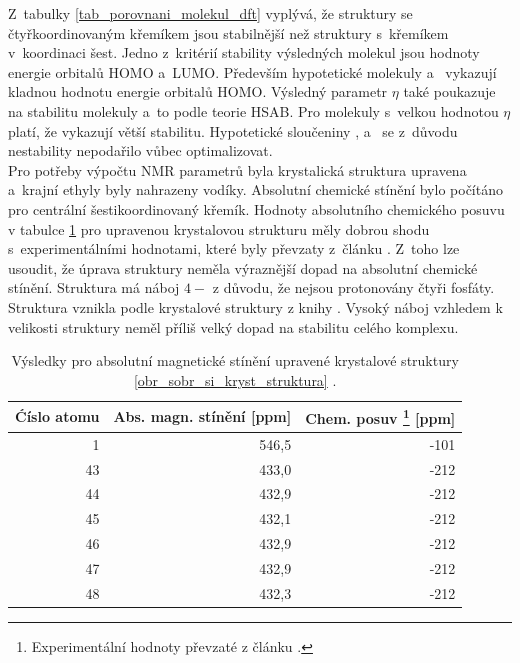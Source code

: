 \documentclass[
  printed, %
  table,   %
  lof,     %
  lot,     %
  oneside,
]{fithesis3}
\begin{document}
Z~tabulky \ref{tab_porovnani_molekul_dft} vyplývá, že struktury se čtyřkoordinovaným křemíkem jsou stabilnější než struktury s~křemíkem v~koordinaci šest. Jedno z~kritérií stability výsledných molekul jsou hodnoty energie orbitalů HOMO a~LUMO. Především hypotetické molekuly  a~ vykazují kladnou hodnotu energie orbitalů HOMO. Výsledný parametr $\eta$ také poukazuje na stabilitu molekuly a~to podle teorie HSAB. Pro molekuly s~velkou hodnotou $\eta$ platí, že vykazují větší stabilitu. Hypotetické sloučeniny  ,  a~ se z~důvodu nestability nepodařilo vůbec optimalizovat. \\
Pro potřeby výpočtu NMR parametrů byla krystalická struktura upravena a~krajní ethyly byly nahrazeny vodíky. Absolutní chemické stínění bylo počítáno pro centrální šestikoordinovaný křemík. Hodnoty absolutního chemického posuvu v tabulce \ref{vysledky_abs_magn_stineni} pro upravenou krystalovou strukturu měly dobrou shodu s~experimentálními hodnotami, které byly převzaty z~článku \cite{C3NJ00721A}. Z~toho lze usoudit, že úprava struktury neměla výraznější dopad na absolutní chemické stínění. Struktura  má náboj $4-$ z důvodu, že nejsou protonovány čtyři fosfáty. Struktura vznikla podle krystalové struktury z knihy \cite{korotcenkov2013handbook}. Vysoký náboj vzhledem k velikosti struktury neměl příliš velký dopad na stabilitu celého komplexu.

\begin{table}[htbp]
\begin{minipage}{\textwidth}
\caption{Výsledky pro absolutní magnetické stínění upravené krystalové struktury \ref{obr_sobr_si_kryst_struktura}  .}
\begin{center}
\begin{tabular}{|r|r|r|}
\hline
\multicolumn{1}{|l|}{Ćíslo atomu} & \multicolumn{1}{l|}{Abs. magn. stínění [ppm]} & \multicolumn{1}{l|}{Chem. posuv \footnote{Experimentální hodnoty převzaté z článku \cite{1316862}.} [ppm]} \\ \hline
1 & 546,5 & -101 \\ \hline
43 & 433,0 & -212 \\ \hline
44 & 432,9 & -212 \\ \hline
45 & 432,1 & -212 \\ \hline
46 & 432,9 & -212 \\ \hline
47 & 432,9 & -212 \\ \hline
48 & 432,3 & -212 \\ \hline
\end{tabular}
\end{center}
\label{vysledky_abs_magn_stineni}
\end{minipage}
\end{table}
\end{document}
